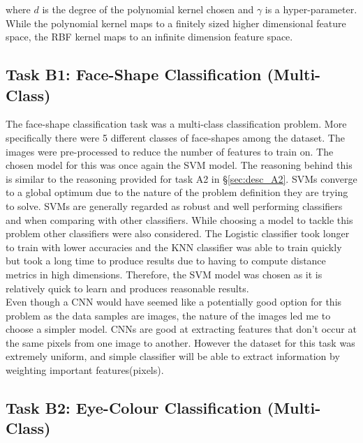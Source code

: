 \documentclass{article}
\begin{document}
    	where $d$ is the degree of the polynomial kernel chosen and $\gamma$ is a hyper-parameter. While the polynomial kernel maps to a finitely sized higher dimensional feature space, the RBF kernel maps to an infinite dimension feature space.
    
    \subsection{Task B1: Face-Shape Classification (Multi-Class)}
    \label{sec:desc_B1}
    
    	The face-shape classification task was a multi-class classification problem. More specifically there were 5 different classes of face-shapes among the dataset. The images were pre-processed to reduce the number of features to train on. The chosen model for this was once again the SVM model. The reasoning behind this is similar to the reasoning provided for task A2 in \S \ref{sec:desc_A2}. SVMs converge to a global optimum due to the nature of the problem definition they are trying to solve. SVMs are generally regarded as robust and well performing classifiers and when comparing with other classifiers. While choosing a model to tackle this problem other classifiers were also considered. The Logistic classifier took longer to train with lower accuracies and the KNN classifier was able to train quickly but took a long time to produce results due to having to compute distance metrics in high dimensions. Therefore, the SVM model was chosen as it is relatively quick to learn and produces reasonable results.
    	\\
    	
    	Even though a CNN would have seemed like a potentially good option for this problem as the data samples are images, the nature of the images led me to choose a simpler model. CNNs are good at extracting features that don't occur at the same pixels from one image to another. However the dataset for this task was extremely uniform, and simple classifier will be able to extract information by weighting important features(pixels).
    
    \subsection{Task B2: Eye-Colour Classification (Multi-Class)}
    \label{sec:desc_B2}
	    
\end{document}
